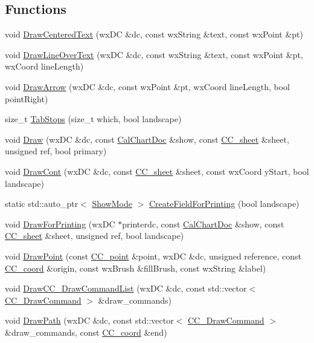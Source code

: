 \subsection*{Functions}
\begin{DoxyCompactItemize}
\item 
void \hyperlink{a00222_a8ff463e639a3492b3fd03f03c8ebeae6}{Draw\-Centered\-Text} (wx\-D\-C \&dc, const wx\-String \&text, const wx\-Point \&pt)
\item 
void \hyperlink{a00222_ad714bcd6c4fd1fa1355dc7e601dbd469}{Draw\-Line\-Over\-Text} (wx\-D\-C \&dc, const wx\-String \&text, const wx\-Point \&pt, wx\-Coord line\-Length)
\item 
void \hyperlink{a00222_a85c16c06fd204ff9f16eaa6261501d18}{Draw\-Arrow} (wx\-D\-C \&dc, const wx\-Point \&pt, wx\-Coord line\-Length, bool point\-Right)
\item 
size\-\_\-t \hyperlink{a00222_a982d12077c2fa0e48c3b6fed641d18ff}{Tab\-Stops} (size\-\_\-t which, bool landscape)
\item 
void \hyperlink{a00222_a9c84907a1eefb185f3bac8be2c36d5ad}{Draw} (wx\-D\-C \&dc, const \hyperlink{a00020}{Cal\-Chart\-Doc} \&show, const \hyperlink{a00045}{C\-C\-\_\-sheet} \&sheet, unsigned ref, bool primary)
\item 
void \hyperlink{a00222_a086b0d11791ce4f8844bffe82d76642a}{Draw\-Cont} (wx\-D\-C \&dc, const \hyperlink{a00045}{C\-C\-\_\-sheet} \&sheet, const wx\-Coord y\-Start, bool landscape)
\item 
static std\-::auto\-\_\-ptr$<$ \hyperlink{a00140}{Show\-Mode} $>$ \hyperlink{a00222_a4834d97b014ce6520c9bc08e31d212b7}{Create\-Field\-For\-Printing} (bool landscape)
\item 
void \hyperlink{a00222_a2f16dc148b22624d9a9b3fcf35853db5}{Draw\-For\-Printing} (wx\-D\-C $\ast$printerdc, const \hyperlink{a00020}{Cal\-Chart\-Doc} \&show, const \hyperlink{a00045}{C\-C\-\_\-sheet} \&sheet, unsigned ref, bool landscape)
\item 
void \hyperlink{a00222_ac13870e1591af9c6df39e179b330fc97}{Draw\-Point} (const \hyperlink{a00034}{C\-C\-\_\-point} \&point, wx\-D\-C \&dc, unsigned reference, const \hyperlink{a00029}{C\-C\-\_\-coord} \&origin, const wx\-Brush \&fill\-Brush, const wx\-String \&label)
\item 
void \hyperlink{a00222_a35fc6442f62d162b1315bb7d282ead45}{Draw\-C\-C\-\_\-\-Draw\-Command\-List} (wx\-D\-C \&dc, const std\-::vector$<$ \hyperlink{a00031}{C\-C\-\_\-\-Draw\-Command} $>$ \&draw\-\_\-commands)
\item 
void \hyperlink{a00222_a4adaedde3065588e0885145119f525aa}{Draw\-Path} (wx\-D\-C \&dc, const std\-::vector$<$ \hyperlink{a00031}{C\-C\-\_\-\-Draw\-Command} $>$ \&draw\-\_\-commands, const \hyperlink{a00029}{C\-C\-\_\-coord} \&end)
\end{DoxyCompactItemize}
